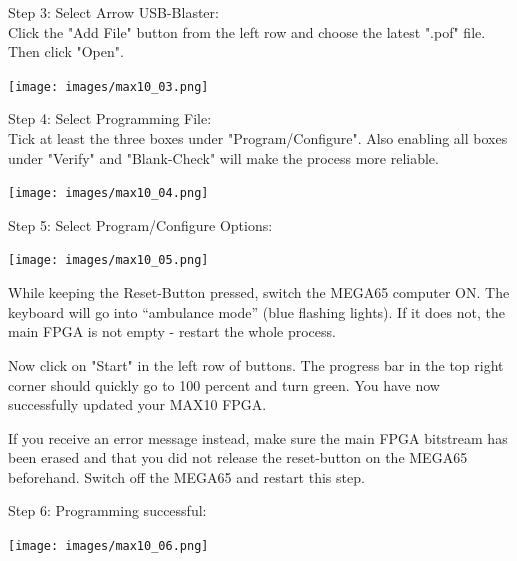 \begin{minipage}{\linewidth}
Step 3: Select Arrow USB-Blaster: \\
Click the "Add File" button from the left row and choose the
latest ".pof" file. Then click "Open".
  \begin{center}
  \texttt{[image: images/max10\_03.png]}
  \end{center}
\end{minipage}


\begin{minipage}{\linewidth}
Step 4: Select Programming File: \\
Tick at least the three boxes under "Program/Configure".
Also enabling all boxes under "Verify" and "Blank-Check"
will make the process more reliable.
  \begin{center}
  \texttt{[image: images/max10\_04.png]}
  \end{center}
\end{minipage}

\vspace{5mm}

\begin{minipage}{\linewidth}
Step 5: Select Program/Configure Options:
  \begin{center}
  \texttt{[image: images/max10\_05.png]}
  \end{center}
\end{minipage}

While keeping the Reset-Button pressed, switch the MEGA65 computer ON.
The keyboard will go into ``ambulance mode'' (blue flashing lights).
If it does not, the main FPGA is not empty - restart the whole process.

Now click on "Start" in the left row of buttons. The progress bar in
the top right corner should quickly go to 100 percent and turn green.
You have now successfully updated your MAX10 FPGA.

If you receive an error message instead, make sure the main FPGA
bitstream has been erased and that you did not release the reset-button on
the MEGA65 beforehand. Switch off the MEGA65 and restart this step.

\begin{minipage}{\linewidth}
Step 6: Programming successful:
  \begin{center}
  \texttt{[image: images/max10\_06.png]}
  \end{center}
\end{minipage}

